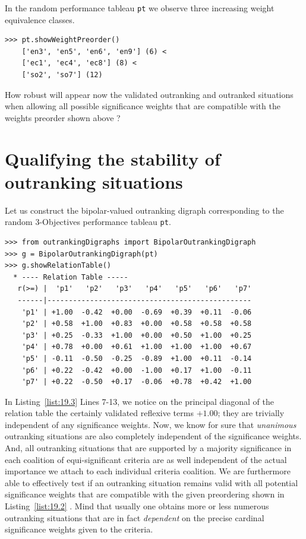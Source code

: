 In the random performance tableau \texttt{pt} we observe three increasing weight equivalence classes.
\begin{lstlisting}[caption={The significance weights preorder},label=list:19.2]
>>> pt.showWeightPreorder()
    ['en3', 'en5', 'en6', 'en9'] (6) <
    ['ec1', 'ec4', 'ec8'] (8) <
    ['so2', 'so7'] (12)
\end{lstlisting}

How robust will appear now the validated outranking and outranked situations when allowing all possible significance weights that are compatible with the weights preorder shown above \citep*{BIS-2009,BIS-2014Robust}?

\section{Qualifying the stability of outranking situations}
\label{sec:19.2}

Let us construct the bipolar-valued outranking digraph corresponding to the random 3-Objectives performance tableau \texttt{pt}.
\begin{lstlisting}[caption={Example Bipolar Outranking Digraph},label=list:19.3]
>>> from outrankingDigraphs import BipolarOutrankingDigraph
>>> g = BipolarOutrankingDigraph(pt)
>>> g.showRelationTable()
  * ---- Relation Table -----
   r(>=) |  'p1'   'p2'   'p3'   'p4'   'p5'   'p6'   'p7'   
   ------|------------------------------------------------
    'p1' | +1.00  -0.42  +0.00  -0.69  +0.39  +0.11  -0.06  
    'p2' | +0.58  +1.00  +0.83  +0.00  +0.58  +0.58  +0.58  
    'p3' | +0.25  -0.33  +1.00  +0.00  +0.50  +1.00  +0.25  
    'p4' | +0.78  +0.00  +0.61  +1.00  +1.00  +1.00  +0.67  
    'p5' | -0.11  -0.50  -0.25  -0.89  +1.00  +0.11  -0.14  
    'p6' | +0.22  -0.42  +0.00  -1.00  +0.17  +1.00  -0.11  
    'p7' | +0.22  -0.50  +0.17  -0.06  +0.78  +0.42  +1.00  
\end{lstlisting}

In Listing~\vref{list:19.3} Lines 7-13, we notice on the principal diagonal of the relation table the certainly validated reflexive terms $+1.00$; they are trivially independent of any significance weights. Now, we know for sure that \emph{unanimous} outranking situations are also completely independent of the significance weights. And, all outranking situations that are supported by a majority significance in each coalition of equi-significant criteria are as well independent of the actual importance we attach to each individual criteria coalition. We are furthermore able to effectively test if an outranking situation remains valid with all potential significance weights that are compatible with the given preordering shown in Listing~\vref{list:19.2} \citep{BIS-2014}. Mind that usually one obtains more or less numerous outranking situations that are in fact \emph{dependent} on the precise cardinal significance weights given to the criteria.

